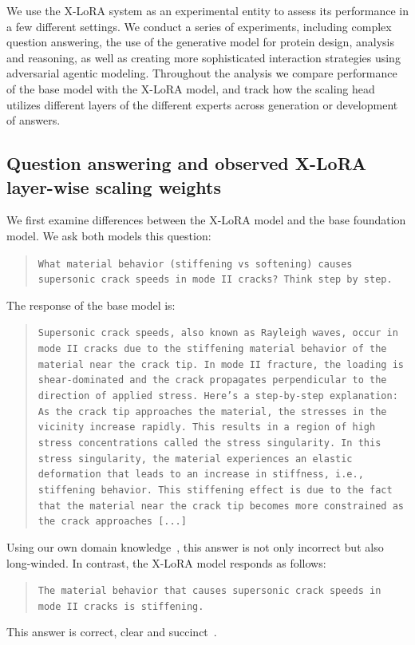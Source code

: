 We use the X-LoRA system as an experimental entity to assess its performance in a few different settings. We conduct a series of experiments, including complex question answering, the use of the generative model for protein design, analysis and reasoning, as well as creating more sophisticated interaction strategies using adversarial agentic modeling. Throughout the analysis we compare performance of the base model with the X-LoRA model, and track how the scaling head utilizes different layers of the different experts across generation or development of answers. 

\subsection{Question answering and observed X-LoRA layer-wise scaling weights}

We first examine differences between the X-LoRA model and the base foundation model. We ask both models this question:
\begin{quote}
\small\texttt{What material behavior (stiffening vs softening) causes supersonic crack speeds in mode II cracks? Think step by step.}
\end{quote}

The response of the base model is:
\begin{quote}
\small\texttt{Supersonic crack speeds, also known as Rayleigh waves, occur in mode II cracks due to the stiffening material behavior of the material near the crack tip. In mode II fracture, the loading is shear-dominated and the crack propagates perpendicular to the direction of applied stress.
Here's a step-by-step explanation:
\newline\newline
As the crack tip approaches the material, the stresses in the vicinity increase rapidly. This results in a region of high stress concentrations called the stress singularity.
\newline\newline
In this stress singularity, the material experiences an elastic deformation that leads to an increase in stiffness, i.e., stiffening behavior. This stiffening effect is due to the fact that the material near the crack tip becomes more constrained as the crack approaches [...]}
\end{quote}
Using our own domain knowledge~\cite{Buehler2008AtomisticFailure}, this answer is not only incorrect but also long-winded. In contrast, the X-LoRA model responds as follows:
\begin{quote}
\small\texttt{The material behavior that causes supersonic crack speeds in mode II cracks is stiffening.}
\end{quote}
This answer is correct, clear and succinct~\cite{Buehler2008AtomisticFailure}. 

